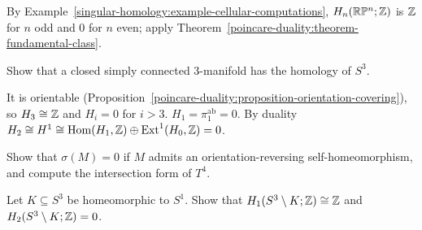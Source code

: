 \begin{solution}
By Example~\ref{singular-homology:example-cellular-computations}, $H_n(\mathbb{R}\mathbb{P}^n; \mathbb{Z})$ is $\mathbb{Z}$ for $n$ odd and $0$ for $n$ even; apply
Theorem~\ref{poincare-duality:theorem-fundamental-class}.
\end{solution}

\begin{exercise}\label{poincare-duality:exercise-homology-sphere}
Show that a closed simply connected $3$-manifold has the homology of $S^3$.
\end{exercise}

\begin{solution}
It is orientable (Proposition~\ref{poincare-duality:proposition-orientation-covering}), so $H_3 \cong \mathbb{Z}$ and $H_i = 0$ for $i > 3$. $H_1 = \pi_1^{\mathrm{ab}} = 0$. By duality
$H_2 \cong H^1 \cong \operatorname{Hom}(H_1, \mathbb{Z}) \oplus \operatorname{Ext}^1(H_0, \mathbb{Z}) = 0$.
\end{solution}

\begin{exercise}\label{poincare-duality:exercise-signature-product}
Show that $\sigma(M) = 0$ if $M$ admits an orientation-reversing self-homeomorphism, and compute the intersection form of $T^4$.
\end{exercise}

\begin{exercise}\label{poincare-duality:exercise-knot-complement}
Let $K \subseteq S^3$ be homeomorphic to $S^1$. Show that $H_1(S^3 \setminus K; \mathbb{Z}) \cong \mathbb{Z}$ and $H_2(S^3 \setminus K; \mathbb{Z}) = 0$.
\end{exercise}
